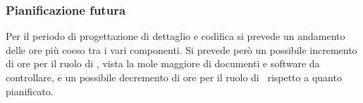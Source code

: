 	\subsubsection{Pianificazione futura}
	Per il periodo di progettazione di dettaglio e codifica si prevede un andamento delle ore più coeso tra i vari componenti. Si prevede però un possibile incremento di ore per il ruolo di \Ver, vista la mole maggiore di documenti e software da controllare, e un possibile decremento di ore per il ruolo di \Prog\ rispetto a quanto pianificato.